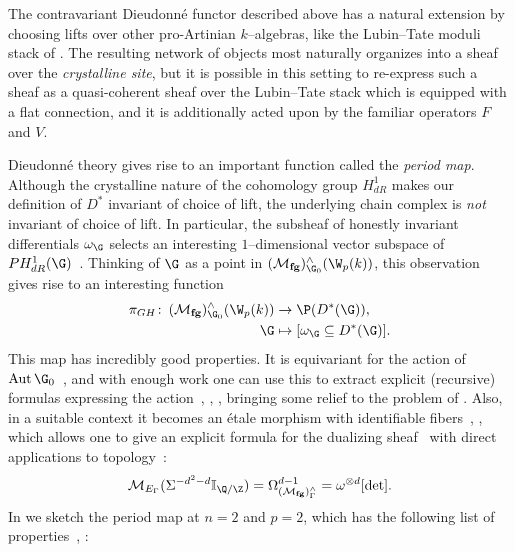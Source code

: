 \begin{remark}
The contravariant Dieudonn\'e functor described above has a natural extension by choosing lifts over other pro-Artinian $k$--algebras, like the Lubin--Tate moduli stack of .  The resulting network of objects most naturally organizes into a sheaf over the \textit{crystalline site}, but it is possible in this setting to re-express such a sheaf as a quasi-coherent sheaf over the Lubin--Tate stack which is equipped with a flat connection, and it is additionally acted upon by the familiar operators $F$ and $V$.
\end{remark}

\begin{remark}\label{ThePeriodMapSection}
Dieudonn\'e theory gives rise to an important function called the \textit{period map}.  Although the crystalline nature of the cohomology group $H^1_{dR}$ makes our definition of $D^*$ invariant of choice of lift, the underlying chain complex is \emph{not} invariant of choice of lift.  In particular, the subsheaf of honestly invariant differentials $\omega_{\G}$ selects an interesting $1$--dimensional vector subspace of $PH^1_{dR}(\G)$~\cite[Section 2.3]{MoravaCobordismComodules}.  Thinking of $\G$ as a point in $(\moduli{fg})^\wedge_{\G_0}(\W_p(k))$, this observation gives rise to an interesting function
\begin{align*}
\pi_{GH}\co (\moduli{fg})^\wedge_{\G_0}(\W_p(k)) & \to \P(D^*(\G)), \\
\G & \mapsto [\omega_{\G} \subseteq D^*(\G)].
\end{align*}
This map has incredibly good properties.  It is equivariant for the action of $\Aut \G_0$~\cite[Theorem 1]{HopkinsGrossAnnouncement}, and with enough work one can use this to extract explicit (recursive) formulas expressing the action~\cite{DevinatzHopkins}, \cite[Section 24]{StricklandFPFP}, \cite[Section 22]{HopkinsGrossEquivVBs}, bringing some relief to the problem of .  Also, in a suitable context it becomes an \'etale morphism with identifiable fibers~\cite[Theorem 1]{HopkinsGrossAnnouncement}, \cite[Sections 23-4]{HopkinsGrossEquivVBs}, which allows one to give an explicit formula for the dualizing sheaf~\cite[Corollary 3]{HopkinsGrossAnnouncement} with direct applications to topology~\cite[Theorem 6]{HopkinsGrossAnnouncement}: \[\context{E_\Gamma}(\Susp^{-d^2 - d} \mathbb I_{\Q/\Z}) = \Omega^{d - 1}_{(\moduli{fg})^\wedge_\Gamma} = \omega^{\otimes d}[\det].\]  In  we sketch the period map at $n = 2$ and $p = 2$, which has the following list of properties~\cite[Appendix 25]{HopkinsGrossEquivVBs}, \cite{Yu}:

\end{remark}
